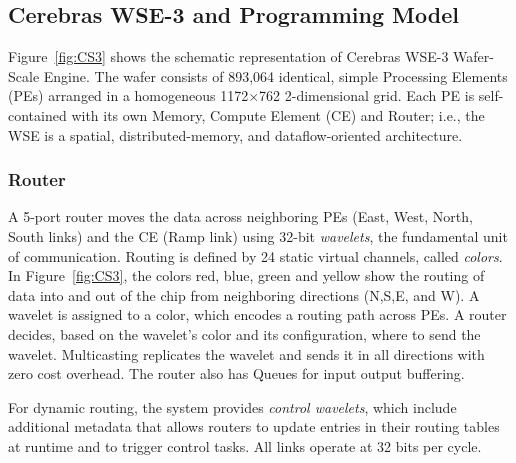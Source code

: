 \documentclass[sigconf]{acmart}
\begin{document}
\subsection{Cerebras WSE-3 and Programming Model}
Figure~\ref{fig:CS3} shows the schematic representation of Cerebras WSE-3 Wafer-Scale Engine. 
The wafer  consists of  893{,}064 identical, simple Processing Elements (PEs) arranged in a homogeneous 1172$\times$762 2-dimensional grid. Each PE is self-contained with its own Memory, Compute Element (CE) and Router; i.e.,  the WSE is a spatial, distributed-memory, and dataflow-oriented architecture. %

\subsubsection{Router}
A 5-port router moves the data across neighboring PEs (East, West, North, South links) and the CE (Ramp link) using 32-bit \textit{wavelets}, the fundamental unit of communication. Routing is defined by 24 static virtual channels, called \textit{colors}.  In Figure~\ref{fig:CS3}, the colors red, blue, green and yellow show the routing of data into and out of the chip from neighboring directions (N,S,E, and W). %
A wavelet is assigned to a color, which encodes a routing path across PEs. A router decides, based on the wavelet's color and its configuration, where to send the wavelet.
Multicasting replicates the wavelet and sends it in all directions with zero cost overhead. The router also has Queues for input output buffering. 

For dynamic routing, the system provides \textit{control wavelets}, which include additional metadata that allows routers to update entries in their routing tables at runtime and to trigger control tasks. %
All links operate at 32 bits per cycle.
\end{document}
